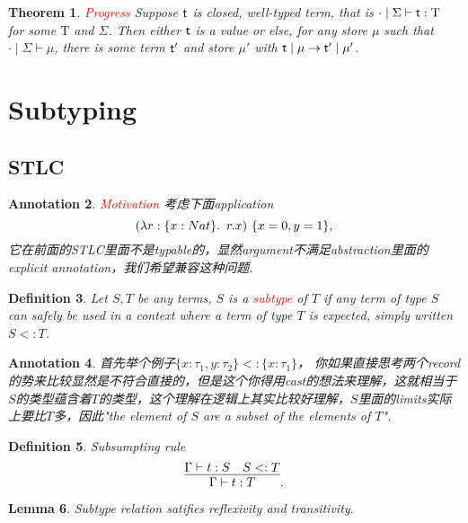 \documentclass{article}
\theoremstyle{plain}
\newtheorem{theorem}{Theorem}
\newtheorem{lemma}[theorem]{Lemma}
\newtheorem{definition}[theorem]{Definition}
\newtheorem{annotation}[theorem]{Annotation}
\theoremstyle{nonumberplain}
\newcommand{\lam}[2]{\ensuremath{\lambda #1\ldotp~ #2}} %
\newcommand{\singletype}[1]{\text{#1}}
\newcommand{\termtype}[2]{\ensuremath{#1:#2}}
\newcommand{\term}[1]{\ensuremath\mathsf{#1}}
\newcommand{\subtyp}[2]{#1<:#2}
\newcommand{\redt}[1]{\textcolor{red}{#1}}
\begin{document}
\begin{theorem}
\rm \redt{Progress} Suppose $\term{t}$ is closed, well-typed term, that is $\cdot \mid \Sigma \vdash \termtype{\term{t}}{\singletype{T}}$ for some $\singletype{T}$ and $\Sigma$. Then either $\term{t}$ is a value or else, for any store $\mu$ such that $\cdot \mid \Sigma \vdash \mu$, there is some term $\term{t}'$ and store $\mu'$ with $\term{t} \mid \mu \to \term{t}' \mid \mu'$.
\end{theorem}


\newpage
\section{Subtyping}

\subsection{STLC}
\begin{annotation}
\rm \redt{Motivation} 考虑下面application
$$
(\lam{\termtype{r}{\{x:Nat\}}}{r.x})~\{x=0,y=1\},
$$
它在前面的STLC里面不是typable的，显然argument不满足abstraction里面的explicit annotation，我们希望兼容这种问题. 
\end{annotation}

\begin{definition}
\rm Let $S,T$ be any terms, $S$ is a \redt{subtype} of $T$ if any term of type $S$ can safely be used in a context where a term of type $T$ is expected, simply written $\subtyp{S}{T}$. 
\end{definition}

\begin{annotation}
\rm 首先举个例子$\subtyp{\{x:\tau_1, y:\tau_2\} }{\{x:\tau_1\}}$，
你如果直接思考两个record的势来比较显然是不符合直接的，但是这个你得用cast的想法来理解，这就相当于$S$的类型蕴含着$T$的类型，这个理解在逻辑上其实比较好理解，$S$里面的limits实际上要比$T$多，因此"the element of $S$ are a subset of the elements of $T$". 
\end{annotation}

\begin{definition}
\rm Subsumpting rule
$$
\infer{\Gamma \vdash \termtype{t}{T}}{\Gamma \vdash \termtype{t}{S} & \subtyp{S}{T}}.
$$
\end{definition}

\begin{lemma}
\rm Subtype relation satifies reflexivity and transitivity. 
\end{lemma}
\end{document}
